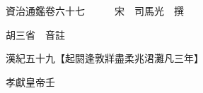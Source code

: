 










 


 
 


 

  
  
  
  
  





  
  
  
  
  
 
  

  

  
  
  



  

 
 

  
   




  

  
  


  　　資治通鑑卷六十七　　　宋　司馬光　撰

　　胡三省　音註

　　漢紀五十九【起閼逢敦牂盡柔兆涒灘凡三年】

　　孝獻皇帝壬

